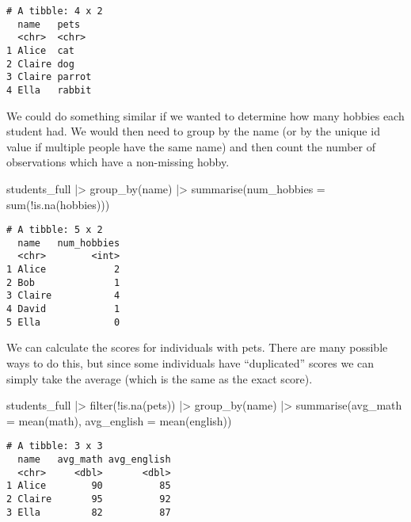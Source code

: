 \documentclass[
  letterpaper,
  DIV=11,
  numbers=noendperiod]{scrreprt}
\newenvironment{Shaded}{\begin{snugshade}}{\end{snugshade}}
\newcommand{\AttributeTok}[1]{\textcolor[rgb]{0.40,0.45,0.13}{#1}}
\newcommand{\FunctionTok}[1]{\textcolor[rgb]{0.28,0.35,0.67}{#1}}
\newcommand{\NormalTok}[1]{\textcolor[rgb]{0.00,0.23,0.31}{#1}}
\newcommand{\SpecialCharTok}[1]{\textcolor[rgb]{0.37,0.37,0.37}{#1}}
\begin{document}
\begin{verbatim}
# A tibble: 4 x 2
  name   pets  
  <chr>  <chr> 
1 Alice  cat   
2 Claire dog   
3 Claire parrot
4 Ella   rabbit
\end{verbatim}

We could do something similar if we wanted to determine how many hobbies
each student had. We would then need to group by the name (or by the
unique id value if multiple people have the same name) and then count
the number of observations which have a non-missing hobby.

\begin{Shaded}
\begin{Highlighting}[]
\NormalTok{students\_full }\SpecialCharTok{|\textgreater{}}
  \FunctionTok{group\_by}\NormalTok{(name) }\SpecialCharTok{|\textgreater{}}
  \FunctionTok{summarise}\NormalTok{(}\AttributeTok{num\_hobbies =} \FunctionTok{sum}\NormalTok{(}\SpecialCharTok{!}\FunctionTok{is.na}\NormalTok{(hobbies)))}
\end{Highlighting}
\end{Shaded}

\begin{verbatim}
# A tibble: 5 x 2
  name   num_hobbies
  <chr>        <int>
1 Alice            2
2 Bob              1
3 Claire           4
4 David            1
5 Ella             0
\end{verbatim}

We can calculate the scores for individuals with pets. There are many
possible ways to do this, but since some individuals have ``duplicated''
scores we can simply take the average (which is the same as the exact
score).

\begin{Shaded}
\begin{Highlighting}[]
\NormalTok{students\_full }\SpecialCharTok{|\textgreater{}}
  \FunctionTok{filter}\NormalTok{(}\SpecialCharTok{!}\FunctionTok{is.na}\NormalTok{(pets)) }\SpecialCharTok{|\textgreater{}}
  \FunctionTok{group\_by}\NormalTok{(name) }\SpecialCharTok{|\textgreater{}}
  \FunctionTok{summarise}\NormalTok{(}\AttributeTok{avg\_math =} \FunctionTok{mean}\NormalTok{(math), }\AttributeTok{avg\_english =} \FunctionTok{mean}\NormalTok{(english))}
\end{Highlighting}
\end{Shaded}

\begin{verbatim}
# A tibble: 3 x 3
  name   avg_math avg_english
  <chr>     <dbl>       <dbl>
1 Alice        90          85
2 Claire       95          92
3 Ella         82          87
\end{verbatim}
\end{document}
